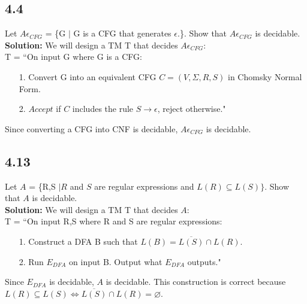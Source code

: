 \subsection*{4.4} Let $A\epsilon_{CFG}$ = \{\textlangle{}G\textrangle{} $|$ G is a CFG that generates $\epsilon$.\}. Show that $A\epsilon_{CFG}$ is decidable.
\\
\textbf{Solution:} We will design a TM T that decides $A\epsilon_{CFG}$:
\\
T = ``On input \textlangle{}G\textrangle{} where G is a CFG:
\begin{enumerate}
\itemsep0em
\item[1.]Convert G into an equivalent CFG $C = (V, \Sigma, R, S)$ in Chomsky Normal Form.
\item[2.]$Accept$ if $C$ includes the rule $S \rightarrow \epsilon$, reject otherwise."
\end{enumerate}
Since converting a CFG into CNF is decidable, $A\epsilon_{CFG}$ is decidable.

\subsection*{4.13} Let $A$ = \{\textlangle{}R,S\textrangle{} $| R$ and $S$ are regular expressions and $L(R) \subseteq L(S)\}$. Show that $A$ is decidable.
\\
\textbf{Solution:} We will design a TM T that decides $A$:
\\
T = ``On input \textlangle{}R,S\textrangle{} where R and S are regular expressions:
\begin{enumerate}
\itemsep0em
\item[1.]Construct a DFA B such that $L(B) = \overline{L(S)} \cap L(R)$.
\item[2.]Run $E_{DFA}$ on input \textlangle{}B\textrangle{}. Output what $E_{DFA}$ outputs."
\end{enumerate}
Since $E_{DFA}$ is decidable, $A$ is decidable. This construction is correct because $L(R) \subseteq L(S) \Leftrightarrow \overline{L(S)} \cap L(R) = \varnothing$.


